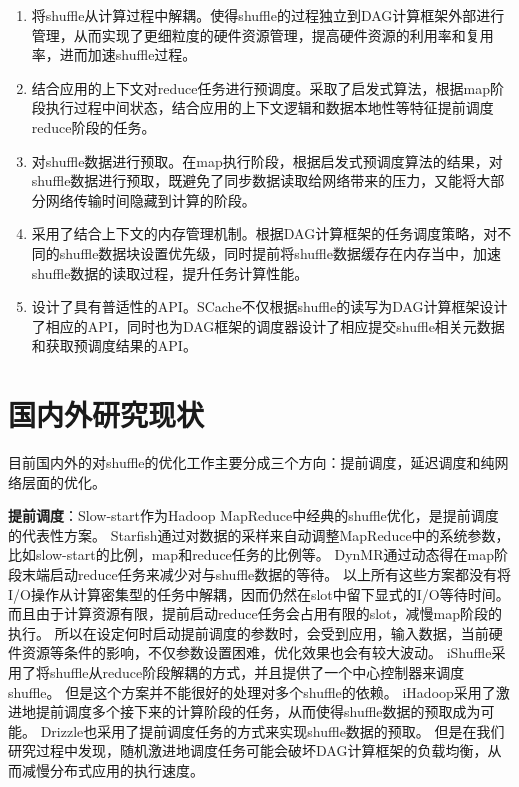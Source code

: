 \begin{enumerate}
	\item 将shuffle从计算过程中解耦。使得shuffle的过程独立到DAG计算框架外部进行管理，从而实现了更细粒度的硬件资源管理，提高硬件资源的利用率和复用率，进而加速shuffle过程。
	\item 结合应用的上下文对reduce任务进行预调度。采取了启发式算法，根据map阶段执行过程中间状态，结合应用的上下文逻辑和数据本地性等特征提前调度reduce阶段的任务。
	\item 对shuffle数据进行预取。在map执行阶段，根据启发式预调度算法的结果，对shuffle数据进行预取，既避免了同步数据读取给网络带来的压力，又能将大部分网络传输时间隐藏到计算的阶段。
	\item 采用了结合上下文的内存管理机制。根据DAG计算框架的任务调度策略，对不同的shuffle数据块设置优先级，同时提前将shuffle数据缓存在内存当中，加速shuffle数据的读取过程，提升任务计算性能。
	\item 设计了具有普适性的API。SCache不仅根据shuffle的读写为DAG计算框架设计了相应的API，同时也为DAG框架的调度器设计了相应提交shuffle相关元数据和获取预调度结果的API。
\end{enumerate}

\section{国内外研究现状}
\label{sec:relatedwork}

目前国内外的对shuffle的优化工作主要分成三个方向：提前调度，延迟调度和纯网络层面的优化。

\textbf{提前调度}：Slow-start作为Hadoop MapReduce\cite{hadoop}中经典的shuffle优化，是提前调度的代表性方案。
Starfish\cite{starfish}通过对数据的采样来自动调整MapReduce中的系统参数，比如slow-start的比例，map和reduce任务的比例等。
DynMR\cite{dynmr}通过动态得在map阶段末端启动reduce任务来减少对与shuffle数据的等待。
以上所有这些方案都没有将I/O操作从计算密集型的任务中解耦，因而仍然在slot中留下显式的I/O等待时间。
而且由于计算资源有限，提前启动reduce任务会占用有限的slot，减慢map阶段的执行。
所以在设定何时启动提前调度的参数时，会受到应用，输入数据，当前硬件资源等条件的影响，不仅参数设置困难，优化效果也会有较大波动。
iShuffle\cite{ishuffle}采用了将shuffle从reduce阶段解耦的方式，并且提供了一个中心控制器来调度shuffle。
但是这个方案并不能很好的处理对多个shuffle的依赖。
iHadoop\cite{ihadoop}采用了激进地提前调度多个接下来的计算阶段的任务，从而使得shuffle数据的预取成为可能。
Drizzle\cite{drizzle}也采用了提前调度任务的方式来实现shuffle数据的预取。
但是在我们研究过程中发现，随机激进地调度任务可能会破坏DAG计算框架的负载均衡，从而减慢分布式应用的执行速度。

